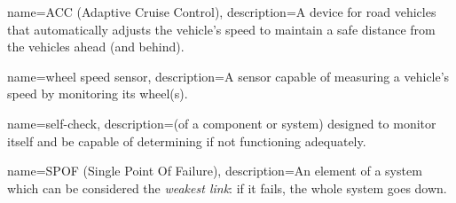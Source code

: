 {%
	name={ACC (Adaptive Cruise Control)},
	description={A device for road vehicles that automatically adjusts the
	vehicle's speed to maintain a safe distance from the vehicles ahead (and
	behind).}
}

{%
	name={wheel speed sensor},
	description={A sensor capable of measuring a vehicle's speed by
	monitoring its wheel(s).}
}

{%
	name={self-check},
	description={(of a component or system) designed to monitor itself and
	be capable of determining if not functioning adequately.}
}

{%
	name={SPOF (Single Point Of Failure)},
	description={An element of a system which can be considered the
	\emph{weakest link}: if it fails, the whole system goes down.}
}
